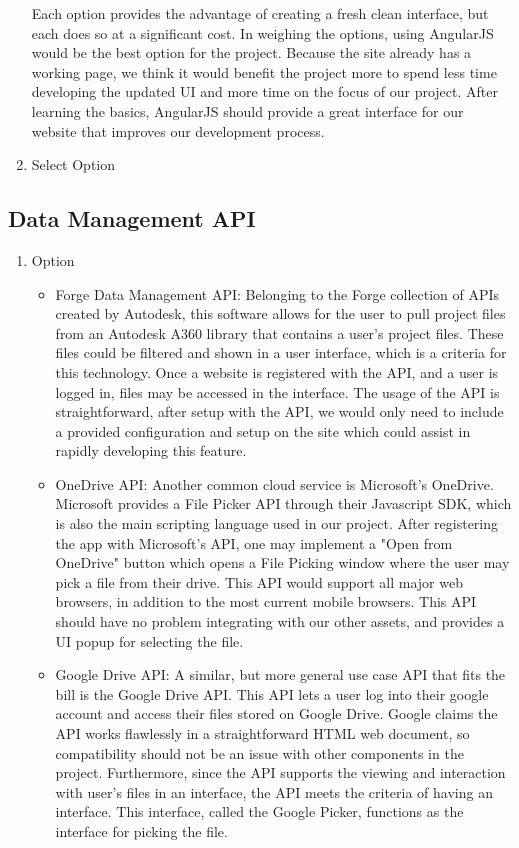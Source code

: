 \documentclass[letterpaper, 10pt, draftclsnofoot, compsoc, onecolumn]{IEEEtran}
\begin{document}
\begin{enumerate}
			Each option provides the advantage of creating a fresh clean interface, but each does so at a significant cost. In weighing the options, using AngularJS would be the best option for the project. Because the site already has a working page, we think it would benefit the project more to spend less time developing the updated UI and more time on the focus of our project. After learning the basics, AngularJS should provide a great interface for our website that improves our development process.
			\item{Select Option}
		\end{enumerate}
	\subsection{Data Management API}
		\begin{enumerate}
			\item{Option}
				\begin{itemize}
					\item{Forge Data Management API: Belonging to the Forge collection of APIs created by Autodesk, this software allows for the user to pull project files from an Autodesk A360 library that contains a user's project files. These files could be filtered and shown in a user interface, which is a criteria for this technology. Once a website is registered with the API, and a user is logged in, files may be accessed in the interface.  The usage of the API is straightforward, after setup with the API, we would only need to include a provided configuration and setup on the site which could assist in rapidly developing this feature.}
					
					\item{OneDrive API: Another common cloud service is Microsoft's OneDrive. Microsoft provides a File Picker API through their Javascript SDK, which is also the main scripting language used in our project. After registering the app with Microsoft's API, one may implement a "Open from OneDrive" button which opens a File Picking window where the user may pick a file from their drive. This API would support all major web browsers, in addition to the most current mobile browsers. This API should have no problem integrating with our other assets, and provides a UI popup for selecting the file.}

					\item{Google Drive API: A similar, but more general use case API that fits the bill is the Google Drive API. This API lets a user log into their google account and access their files stored on Google Drive. Google claims the API works flawlessly in a straightforward HTML web document, so compatibility should not be an issue with other components in the project. Furthermore, since the API supports the viewing and interaction with user's files in an interface, the API meets the criteria of having an interface. This interface, called the Google Picker, functions as the interface for picking the file.}
					

\end{itemize}
\end{enumerate}
\end{document}
